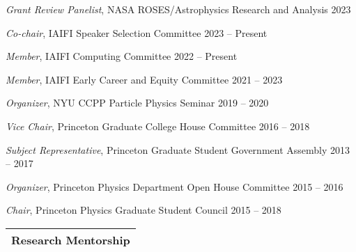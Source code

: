 \documentclass[letterpaper,11pt]{article}
\newenvironment{packed_itemize}{
\begin{itemize}[label=\raisebox{0.25ex}{\tiny$\bullet$}]
  \setlength{\itemsep}{4.2pt}
  \setlength{\parskip}{0pt}
  \setlength{\parsep}{0pt}}{\end{itemize}
}
\begin{document}
\begin{packed_itemize}
  \item \emph{Grant Review Panelist}, NASA ROSES/Astrophysics Research and Analysis \hfill 2023
  \item \emph{Co-chair}, IAIFI Speaker Selection Committee  \hfill 2023 -- Present
  \item \emph{Member}, IAIFI Computing Committee  \hfill 2022 -- Present
  \item \emph{Member}, IAIFI Early Career and Equity Committee  \hfill 2021 -- 2023
  \item \emph{Organizer}, NYU CCPP Particle Physics Seminar \hfill 2019 -- 2020
  \item \emph{Vice Chair}, Princeton Graduate College House Committee \hfill 2016 -- 2018
  \item \emph{Subject Representative}, Princeton Graduate Student Government Assembly \hfill 2013 -- 2017
  \item \emph{Organizer}, Princeton Physics Department Open House Committee  \hfill 2015 -- 2016
  \item \emph{Chair}, Princeton Physics Graduate Student Council \hfill 2015 -- 2018
\end{packed_itemize}
\vspace{2.0mm}



\noindent
\begin{tabular*}{\textwidth}{l@{\extracolsep{\fill}}}
\large {\sc \Large{Research Mentorship}}\\
\hline
\end{tabular*}\vspace{1.mm}
\end{document}
